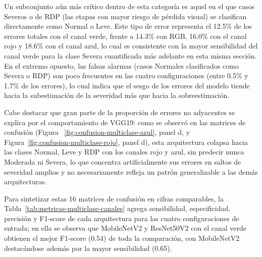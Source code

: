 Un subconjunto aún más crítico dentro de esta categoría es aquel en el que casos Severos o
de RDP (las etapas con mayor riesgo de pérdida visual) se clasifican directamente como
Normal o Leve. Este tipo de error representa el 12.5\% de los errores totales con el canal
verde, frente a 14.3\% con RGB, 16.0\% con el canal rojo y 18.6\% con el canal azul, lo cual
es consistente con la mayor sensibilidad del canal verde para la clase Severa cuantificada
más adelante en esta misma sección. En el extremo opuesto, las falsas alarmas
(casos Normales clasificados como Severa o RDP) son poco frecuentes en las cuatro
configuraciones (entre 0.5\% y 1.7\% de los errores), lo cual indica que el sesgo de los
errores del modelo tiende hacia la subestimación de la severidad más que hacia la
sobreestimación.

Cabe destacar que gran parte de la proporción de errores no adyacentes se explica por el
comportamiento de VGG19: como se observó en las matrices de confusión (Figura~
\ref{fig:confusion-multiclase-azul}, panel d, y Figura~\ref{fig:confusion-multiclase-rojo},
panel d), esta arquitectura colapsa hacia las clases Normal, Leve y RDP con los canales
rojo y azul, sin predecir nunca Moderada ni Severa, lo que concentra artificialmente sus
errores en saltos de severidad amplios y no necesariamente refleja un patrón generalizable
a las demás arquitecturas.

Para sintetizar estas 16 matrices de confusión en cifras comparables, la
Tabla~\ref{tab:metricas-multiclase-canales} agrega sensibilidad, especificidad,
precisión y F1-score de cada arquitectura para las cuatro configuraciones de entrada; en
ella se observa que MobileNetV2 y ResNet50V2 con el canal verde obtienen el mejor
F1-score (0.54) de toda la comparación, con MobileNetV2 destacándose además por la mayor
sensibilidad (0.65).

